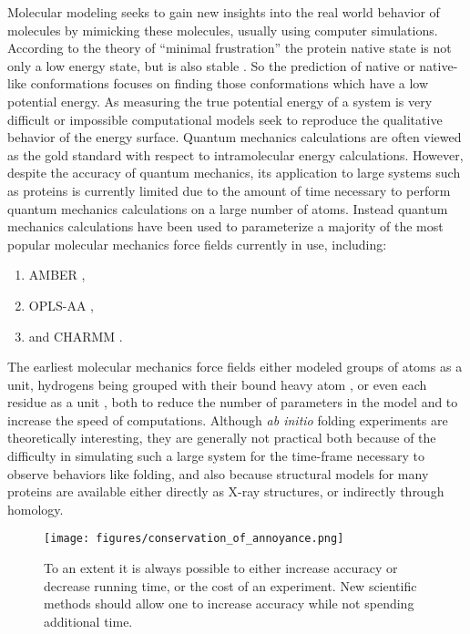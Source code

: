 Molecular modeling seeks to gain new insights into the real world behavior of molecules by mimicking these molecules, usually using computer simulations.
According to the theory of ``minimal frustration'' the protein native state is not only a low energy state, but is also stable \cite{bryngelson1987spin}.
So the prediction of native or native-like conformations focuses on finding those conformations which have a low potential energy.
As measuring the true potential energy of a system is very difficult or impossible computational models seek to reproduce the qualitative behavior of the energy surface.
Quantum mechanics calculations are often viewed as the gold standard with respect to intramolecular energy calculations.
However, despite the accuracy of quantum mechanics, its application to large systems such as proteins is currently limited due to the amount of time necessary to perform quantum mechanics calculations on a large number of atoms.
Instead quantum mechanics calculations have been used to parameterize a majority of the most popular molecular mechanics force fields currently in use, including:
\begin{enumerate}
\item AMBER \cite{weiner1984new},
\item OPLS-AA \cite{kaminski1994free},
\item and CHARMM \cite{mackerell2002charmm}.
\end{enumerate}

The earliest molecular mechanics force fields either modeled groups of atoms as a unit, hydrogens being grouped with their bound heavy atom \cite{jorgensen1988opls}, or even each residue as a unit \cite{lee1999energy}, both to reduce the number of parameters in the model and to increase the speed of computations.
Although {\it ab initio} folding experiments are theoretically interesting, they are generally not practical both because of the difficulty in simulating such a large system for the time-frame necessary to observe behaviors like folding, and also because structural models for many proteins are available either directly as X-ray structures, or indirectly through homology.

\begin{figure}[h]
\begin{center}
\texttt{[image: figures/conservation\_of\_annoyance.png]}
\caption{To an extent it is always possible to either increase accuracy or decrease running time, or the cost of an experiment.
New scientific methods should allow one to increase accuracy while not spending additional time.}
\label{figure:conservation_of_annoyance}
\end{center}
\end{figure}

